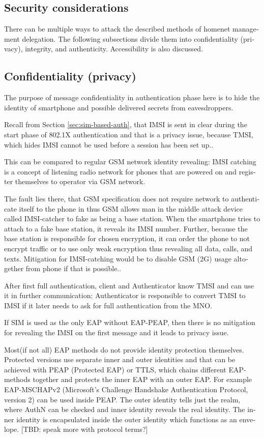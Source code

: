 \documentclass[12pt,a4paper,english]{tutthesis}
\begin{document}
\begin{otherlanguage}{english}
\section{Security considerations}
\label{sec-6-5}



There can be multiple ways to attack the described methods of
homenet management delegation. The following subsections divide them into
confidentiality (privacy), integrity, and
authenticity. Accessibility is also discussed.
\subsection{Confidentiality (privacy)}
\label{sec-6-5-1}
The purpose of message confidentiality in authentication phase here is
to hide the identity of smartphone and possible delivered secrets from
eavesdroppers. 

Recall from Section \ref{sec:sim-based-auth}, that IMSI is sent in clear 
during the start phase of 802.1X authentication and that is a privacy 
issue, because TMSI, which hides IMSI cannot be used before a session
has been set
 up.\cite[p.66]{rfc4186}.

This can be compared to regular GSM network identity revealing: IMSI
catching is a concept of listening radio network for phones that are
powered on and register themselves to operator via GSM network.  

The
fault lies there, that GSM specification does not require network to
authenticate itself to the phone in thus GSM allows man in the middle
attack device called IMSI-catcher to fake as being a base station.
When the smartphone tries to attach to a fake base station, it reveals its
IMSI number. Further, because the base station is responsible for chosen
encryption, it can order the phone to not encrypt traffic or to use only
weak encryption thus revealing all data, calls, and
texts. Mitigation for IMSI-catching would be to
disable GSM (2G) usage altogether from phone if that is possible.\cite{imsi-heise}.

After first full authentication, client and Authenticator 
know TMSI and can use it in further communication: Authenticator 
is responsible to convert TMSI to IMSI if it later needs to 
ask for full authentication from the MNO.


If SIM is used as the only EAP without EAP-PEAP, then 
there is no mitigation for revealing the IMSI on the first message
and it leads to privacy issue.

Most(if not all) EAP methods do not provide identity protection
themselves. Protected versions
use separate  inner and outer identities and that can be achieved with
PEAP (Protected  EAP) or TTLS, which chains different EAP-methods together and
protects the inner EAP with an outer EAP. For example 
EAP-MSCHAPv2 (Microsoft's Challenge Handshake Authentication Protocol,
version 2) can be used inside PEAP.
The outer identity tells just the realm, where AuthN can be checked
 and inner identity reveals the real identity.
The inner identity is encapsulated inside the outer identity which
functions as an envelope. [TBD: speak more with protocol terms?]



\end{otherlanguage}
\end{document}
